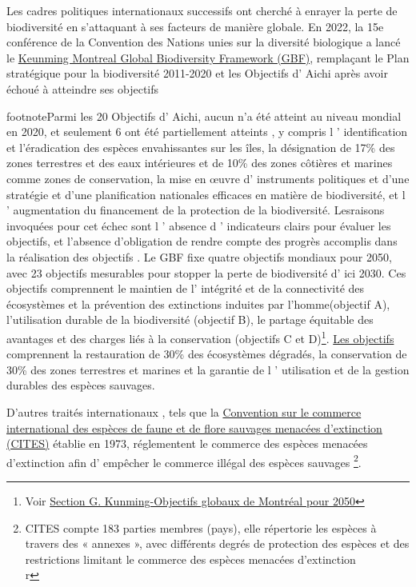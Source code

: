 \begin{displayquote}
\begin{displayquote}
\begin{displayquote}
{  Les cadres politiques internationaux successifs ont cherché à enrayer la perte de biodiversité en s'attaquant à ses facteurs de manière globale.     En 2022, la 15e conférence de la Convention des Nations unies sur la diversité biologique a lancé le \href{https://www.cbd.int/doc/c/e6d3/cd1d/daf663719a03902a9b116c34/cop-15-l-25-fr. pdf}{Keunming Montreal Global Biodiversity Framework (GBF)}, remplaçant le Plan stratégique pour la biodiversité 2011-2020 et les Objectifs d' Aichi après avoir échoué à atteindre ses objectifs{footnote{Parmi les 20 Objectifs d' Aichi, aucun n'a été atteint au niveau mondial en 2020, et seulement 6 ont été partiellement atteints , y compris l ' identification et l'éradication des espèces envahissantes sur les îles, la désignation de 17\% des zones terrestres et des eaux intérieures et de 10\% des zones côtières et marines comme zones de conservation, la mise en œuvre d' instruments politiques et d'une stratégie et d'une planification nationales efficaces en matière de biodiversité, et l ' augmentation du financement de la protection de la biodiversité.   Lesraisons invoquées pour cet échec sont l ' absence d ' indicateurs clairs pour évaluer les objectifs, et l'absence d'obligation de rendre compte des progrès accomplis dans la réalisation des objectifs \citep{maron_setting_2021}}. Le GBF fixe quatre objectifs mondiaux pour 2050, avec 23 objectifs mesurables pour stopper la perte de biodiversité d' ici 2030. Ces objectifs comprennent le maintien de l' intégrité et de la connectivité des écosystèmes et la prévention des extinctions induites par l'homme(objectif A), l'utilisation durable de la biodiversité (objectif B), le partage équitable des avantages et des charges liés à la conservation (objectifs C et D)\footnote{Voir \href{https://www.cbd.int/doc/c/e6d3/cd1d/daf663719a03902a9b116c34/cop-15-l-25-fr.pdf}{Section G. Kunming-Objectifs globaux de Montréal pour 2050}}. \href{https://www.cbd.int/gbf/targets/5}{Les objectifs } comprennent la restauration de 30\% des écosystèmes dégradés, la conservation de 30\% des zones terrestres et marines et la garantie de l ' utilisation et de la gestion durables des espèces sauvages.
  
 
  D'autres traités internationaux , tels que la \href{https://cites.org/fra}{Convention sur le commerce international des espèces de faune et de flore sauvages menacées d'extinction (CITES)} établie en 1973, réglementent le commerce des espèces menacées d'extinction afin d' empêcher le commerce illégal des espèces sauvages \footnote{CITES compte 183 parties membres (pays), elle répertorie les espèces à travers des « annexes », avec différents degrés de protection des espèces et des restrictions limitant le commerce des espèces menacées d'extinction \\r}.

}}
\end{displayquote}
\end{displayquote}
\end{displayquote}
